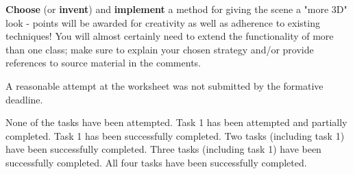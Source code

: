 \documentclass{../../../fal_assignment}
\begin{document}
\textbf{Choose} (or \textbf{invent}) and \textbf{implement} a method for giving the scene a "more 3D" look - points will be awarded for creativity as well as adherence to existing techniques! You will almost certainly need to extend the functionality of more than one class; make sure to explain your chosen strategy and/or provide references to source material in the comments.

\begin{markingrubric}

		\grade\fail	A reasonable attempt at the worksheet was not submitted by the formative deadline.
		\vspace{\baselineskip}
		
        \grade\fail None of the tasks have been attempted.
		\grade Task 1 has been attempted and partially completed.
		\grade Task 1 has been successfully completed.
		\grade Two tasks (including task 1) have been successfully completed.
		\grade Three tasks (including task 1) have been successfully completed.
		\vspace{\baselineskip}
		\grade All four tasks have been successfully completed.


\end{markingrubric}
\end{document}
